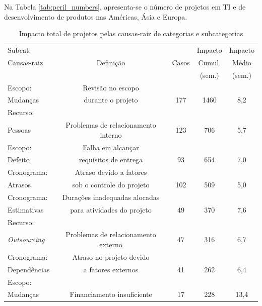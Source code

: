 Na Tabela \ref{tab:peril_numbers}, apresenta-se o número de projetos em TI e de desenvolvimento de produtos nas Américas, Ásia e Europa.

\begin{table}[h]
\caption{Impacto total de projetos pelas causas-raiz de categorias e subcategorias \cite{KEND2003BOOK}}\label{tab:peril_pareto} \centering
\begin{tabular}{|l|c|c|c|c|}
 \hline
 Subcat. & & & Impacto & Impacto \\
 Causas-raiz & Definição & Casos & Cumul. & Médio \\
  &  &  & (sem.) & (sem.) \\
 \hline
  Escopo: & Revisão no escopo &  &  &  \\
  Mudanças & durante o projeto & 177 & 1460 & 8,2 \\
 \hline
  Recurso: &  &  &  &  \\
  Pessoas & Problemas de relacionamento interno & 123 & 706 & 5,7 \\
 \hline
  Escopo: & Falha em alcançar  &  &  &  \\
  Defeito & requisitos de entrega & 93 & 654 & 7,0 \\
 \hline
  Cronograma: & Atraso devido a fatores &  &  &  \\
  Atrasos & sob o controle do projeto & 102 & 509 & 5,0 \\
 \hline
  Cronograma: & Durações inadequadas alocadas &  &  &  \\
  Estimativas & para atividades do projeto & 49 & 370 & 7,6 \\
 \hline
  Recurso: &  &  &  &  \\
  \textit{Outsourcing} & Problemas de relacionamento externo & 47 & 316 & 6,7 \\
 \hline
  Cronograma: & Atraso no projeto devido &  &  &  \\
  Dependências & a fatores externos & 41 & 262 & 6,4 \\
 \hline
  Escopo: &  &  &  &  \\
  Mudanças & Financiamento insuficiente & 17 & 228 & 13,4 \\
 \hline
\end{tabular}
\end{table}
